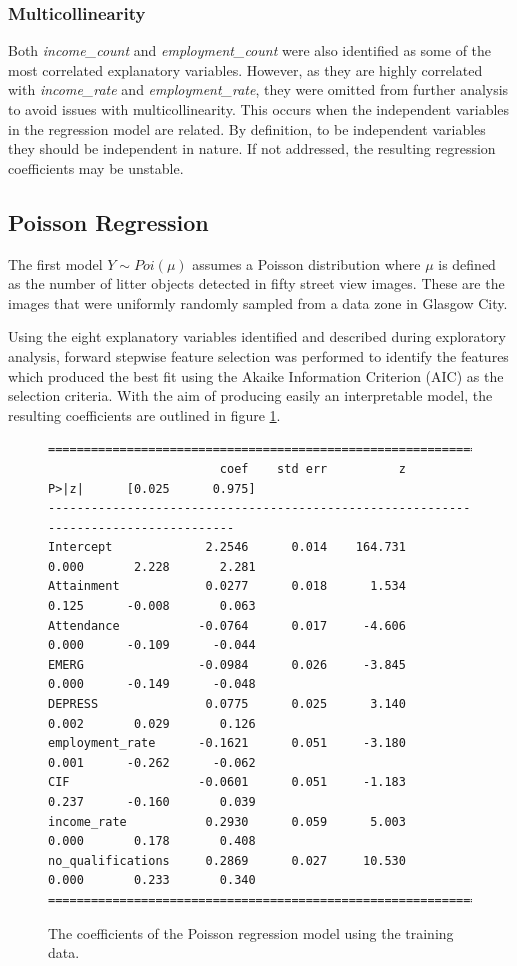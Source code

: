 \documentclass{thesis}
\begin{document}
\subsubsection{Multicollinearity}

Both \textit{income\_count} and \textit{employment\_count} were also identified as some of the most correlated explanatory variables. However, as they are highly correlated with \textit{income\_rate} and \textit{employment\_rate}, they were omitted from further analysis to avoid issues with multicollinearity. This occurs when the independent variables in the regression model are related. By definition, to be independent variables they should be independent in nature. If not addressed, the resulting regression coefficients may be unstable.

\subsection{Poisson Regression}

The first model $Y \sim Poi(\mu)$ assumes a Poisson distribution where $\mu$ is defined as the number of litter objects detected in fifty street view images. These are the images that were uniformly randomly sampled from a data zone in Glasgow City.

Using the eight explanatory variables identified and described during exploratory analysis, forward stepwise feature selection was performed to identify the features which produced the best fit using the Akaike Information Criterion (AIC) as the selection criteria. With the aim of producing easily an interpretable model, the resulting coefficients are outlined in figure \ref{fig:pos-coeff}.

\begin{figure}[h!]
    \centering
\footnotesize
\begin{verbatim}
=====================================================================================
                        coef    std err          z      P>|z|      [0.025      0.975]
-------------------------------------------------------------------------------------
Intercept             2.2546      0.014    164.731      0.000       2.228       2.281
Attainment            0.0277      0.018      1.534      0.125      -0.008       0.063
Attendance           -0.0764      0.017     -4.606      0.000      -0.109      -0.044
EMERG                -0.0984      0.026     -3.845      0.000      -0.149      -0.048
DEPRESS               0.0775      0.025      3.140      0.002       0.029       0.126
employment_rate      -0.1621      0.051     -3.180      0.001      -0.262      -0.062
CIF                  -0.0601      0.051     -1.183      0.237      -0.160       0.039
income_rate           0.2930      0.059      5.003      0.000       0.178       0.408
no_qualifications     0.2869      0.027     10.530      0.000       0.233       0.340
=====================================================================================
\end{verbatim}
\normalsize
    \caption{The coefficients of the Poisson regression model using the training data.}
    \label{fig:pos-coeff}
\end{figure}
\end{document}
